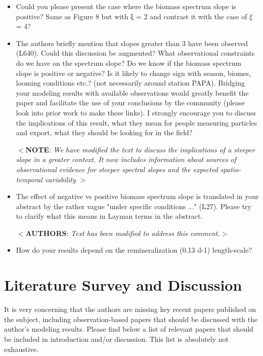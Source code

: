 \documentclass[12pt,letter]{article}
\newcommand{\note}[1]{\color{red}$<$\textbf{NOTE}: \textit{#1}$>$\color{black}}
\newcommand{\rep}[1]{\color{blue}$<$\textbf{AUTHORS}: \textit{#1}$>$\color{black}\\}
\begin{document}
\begin{itemize}
	\item Could you please present the case where the biomass spectrum slope is positive? Same as Figure 8 but with ξ = 2 and contrast it with the case of $\xi$ = 4?
	
	\item The authors briefly mention that slopes greater than 3 have been observed (L640). Could this discussion be augmented? What observational constraints do we have on the spectrum slope? Do we know if the biomass spectrum slope is positive or negative? Is it likely to change sign with season, biomes, looming conditions etc.? (not necessarily around station PAPA). Bridging your modeling results with available observations would greatly benefit the paper and facilitate the use of your conclusions by the community (please look into prior work to make these links). I strongly encourage you to discuss the implications of this result, what they mean for people measuring particles and export, what they should be looking for in the field?
	
	\note{We have modified the text to discuss the implications of a steeper slope in a greater context. It now includes information about sources of observational evidence for steeper spectral slopes and the expected spatio-temporal variability }
	
	\item The effect of negative vs positive biomass spectrum slope is translated in your abstract by the rather vague "under specific conditions ..." (L27). Please try to clarify what this means in Layman terms in the abstract.
	
	\rep{Text has been modified to address this comment.}
	
	\item How do your results depend on the remineralization (0.13 d-1) length-scale? 
\end{itemize}

\section*{Literature Survey and Discussion}
It is very concerning that the authors are missing key recent papers published on the subject, including observation-based papers that should be discussed with the author's modeling results. Please find below a list of relevant papers that should be included in introduction and/or discussion. This list is absolutely not exhaustive. 
\end{document}
